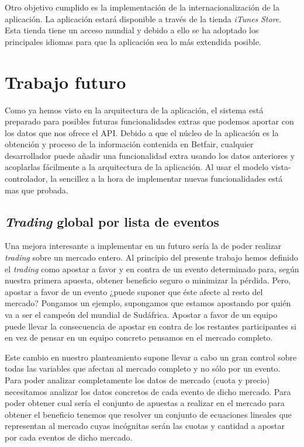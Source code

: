  Otro objetivo cumplido es la implementación de la internacionalización de la aplicación. La aplicación estará disponible a través de la tienda \emph{iTunes} \emph{Store}. Esta tienda tiene un acceso mundial y debido a ello se ha adoptado los principales idiomas para que la aplicación sea lo más extendida posible. 
 
\section{Trabajo futuro}
 Como ya hemos visto en la arquitectura de la aplicación, el sistema está preparado para posibles futuras funcionalidades extras que podemos aportar con los datos que nos ofrece el API. Debido a que el núcleo de la aplicación es la obtención y proceso de la información contenida en Betfair, cualquier desarrollador puede añadir una funcionalidad extra usando los datos anteriores y acoplarlas fácilmente a la arquitectura de la aplicación. Al usar el modelo vista-controlador, la sencillez a la hora de implementar nuevas funcionalidades está mas que probada.
 
\subsection{\emph{Trading} global por lista de eventos}
 Una mejora interesante a implementar en un futuro sería la de poder realizar \emph{trading} sobre un mercado entero. Al principio del presente trabajo hemos definido el \emph{trading} como apostar a favor y en contra de un evento determinado para, según nuestra primera apuesta, obtener beneficio seguro o minimizar la pérdida. Pero, apostar a favor de un evento ¿puede suponer que éste afecte al resto del mercado? Pongamos un ejemplo, supongamos que estamos apostando por quién va a ser el campeón del mundial de Sudáfrica. Apostar a favor de un equipo puede llevar la consecuencia de apostar en contra de los restantes participantes si en vez de pensar en un equipo concreto pensamos en el mercado completo. 
 
  Este cambio en nuestro planteamiento supone llevar a cabo un gran control sobre todas las variables que afectan al mercado completo y no sólo por un evento. Para poder analizar completamente los datos de mercado (cuota y precio) necesitamos analizar los datos concretos de cada evento de dicho mercado. Para poder obtener cual sería el conjunto de apuestas a realizar en el mercado para obtener el beneficio tenemos que resolver un conjunto de ecuaciones lineales que representan al mercado cuyas incógnitas serán las cuotas y cantidad a apostar por cada eventos de dicho mercado.    
  
